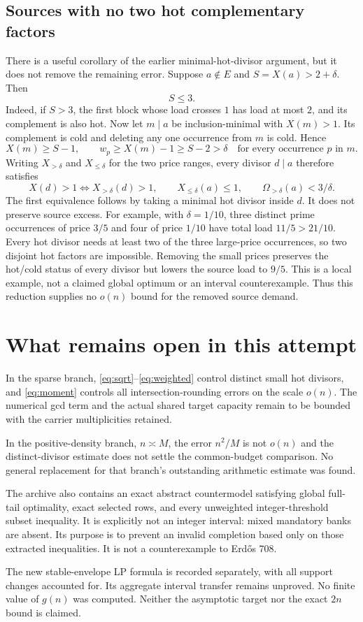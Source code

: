 \documentclass[a4paper,11pt]{article}
\begin{document}
\subsection*{Sources with no two hot complementary factors}
There is a useful corollary of the earlier minimal-hot-divisor argument, but it does not remove the remaining error. Suppose $a\notin E$ and $S=X(a)>2+\delta$. Then
\[
 S\le3.
\]
Indeed, if $S>3$, the first block whose load crosses $1$ has load at most $2$, and its complement is also hot. Now let $m\mid a$ be inclusion-minimal with $X(m)>1$. Its complement is cold and deleting any one occurrence from $m$ is cold. Hence
\[
 X(m)\ge S-1,\qquad w_p\ge X(m)-1\ge S-2>\delta
 \quad\text{for every occurrence }p\text{ in }m.
\]
Writing $X_{>\delta}$ and $X_{\le\delta}$ for the two price ranges, every divisor $d\mid a$ therefore satisfies
\[
 X(d)>1\iff X_{>\delta}(d)>1,
 \qquad X_{\le\delta}(a)\le1,
 \qquad \Omega_{>\delta}(a)<3/\delta.
\]
The first equivalence follows by taking a minimal hot divisor inside $d$. It does not preserve source excess. For example, with $\delta=1/10$, three distinct prime occurrences of price $3/5$ and four of price $1/10$ have total load $11/5>21/10$. Every hot divisor needs at least two of the three large-price occurrences, so two disjoint hot factors are impossible. Removing the small prices preserves the hot/cold status of every divisor but lowers the source load to $9/5$. This is a local example, not a claimed global optimum or an interval counterexample. Thus this reduction supplies no $o(n)$ bound for the removed source demand.

\section{What remains open in this attempt}
In the sparse branch, \eqref{eq:sqrt}--\eqref{eq:weighted} control distinct small hot divisors, and \eqref{eq:moment} controls all intersection-rounding errors on the scale $o(n)$. The numerical gcd term and the actual shared target capacity remain to be bounded with the carrier multiplicities retained.

In the positive-density branch, $n\asymp M$, the error $n^2/M$ is not $o(n)$ and the distinct-divisor estimate does not settle the common-budget comparison. No general replacement for that branch's outstanding arithmetic estimate was found.

The archive also contains an exact abstract countermodel satisfying global full-tail optimality, exact selected rows, and every unweighted integer-threshold subset inequality. It is explicitly not an integer interval: mixed mandatory banks are absent. Its purpose is to prevent an invalid completion based only on those extracted inequalities. It is not a counterexample to Erd\H{o}s 708.

The new stable-envelope LP formula is recorded separately, with all support changes accounted for. Its aggregate interval transfer remains unproved. No finite value of $g(n)$ was computed. Neither the asymptotic target nor the exact $2n$ bound is claimed.
\end{document}
